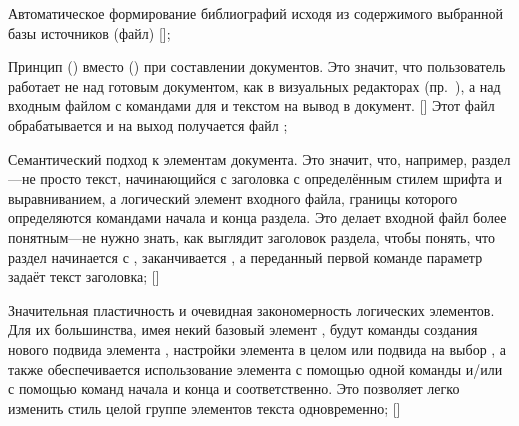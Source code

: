 \startitemize[n]

\startitem

Автоматическое формирование библиографий исходя из содержимого выбранной базы
источников (файл) [];

\stopitem

\startitem

Принцип  () вместо
 () при составлении
документов. Это значит, что пользователь работает не над готовым документом,
как в визуальных редакторах (пр.\ ), а над входным файлом
с командами для  и текстом на вывод в документ.
[] Этот файл обрабатывается  и на
выход получается файл ;

\stopitem

\startitem

Семантический подход к элементам документа. Это значит, что, например,
раздел---не просто текст, начинающийся с заголовка с определённым стилем шрифта
и выравниванием, а логический элемент входного файла, границы которого
определяются командами начала и конца раздела. Это делает входной файл более
понятным---не нужно знать, как выглядит заголовок раздела, чтобы понять, что
раздел начинается с \inlinecontextcode{\startsection}, заканчивается
\inlinecontextcode{\stopsection}, а переданный первой команде параметр
\inlinecontextcode{[title={Текст заголовка}]} задаёт текст заголовка;
[]

\stopitem

\startitem

Значительная пластичность и очевидная закономерность логических элементов. Для
их большинства, имея некий базовый элемент , будут команды
создания нового подвида элемента , настройки
элемента в целом или подвида на выбор \inlinecontextcode{\setupelement}, а
также обеспечивается использование элемента с помощью одной команды
\inlinecontextcode{\element} и/или с помощью команд начала и конца
\inlinecontextcode{\startelement} и \inlinecontextcode{\stopelement}
соответственно. Это позволяет легко изменить стиль целой группе элементов
текста одновременно; []

\stopitem

\startitem

